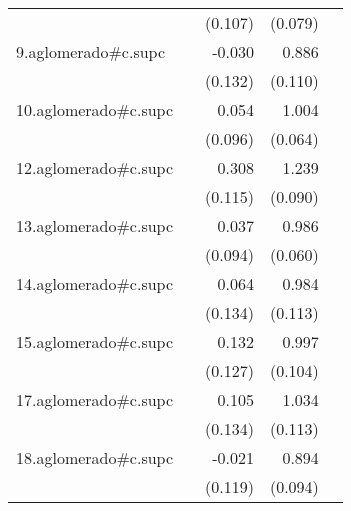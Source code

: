 {\begin{longtable}{l*{4}{D{.}{.}{-1}}}
            &                     &     (0.107)         &     (0.079)         &                     \\
\addlinespace
9.aglomerado#c.supc&                     &      -0.030         &       0.886\sym{***}&                     \\
            &                     &     (0.132)         &     (0.110)         &                     \\
\addlinespace
10.aglomerado#c.supc&                     &       0.054         &       1.004\sym{***}&                     \\
            &                     &     (0.096)         &     (0.064)         &                     \\
\addlinespace
12.aglomerado#c.supc&                     &       0.308\sym{**} &       1.239\sym{***}&                     \\
            &                     &     (0.115)         &     (0.090)         &                     \\
\addlinespace
13.aglomerado#c.supc&                     &       0.037         &       0.986\sym{***}&                     \\
            &                     &     (0.094)         &     (0.060)         &                     \\
\addlinespace
14.aglomerado#c.supc&                     &       0.064         &       0.984\sym{***}&                     \\
            &                     &     (0.134)         &     (0.113)         &                     \\
\addlinespace
15.aglomerado#c.supc&                     &       0.132         &       0.997\sym{***}&                     \\
            &                     &     (0.127)         &     (0.104)         &                     \\
\addlinespace
17.aglomerado#c.supc&                     &       0.105         &       1.034\sym{***}&                     \\
            &                     &     (0.134)         &     (0.113)         &                     \\
\addlinespace
18.aglomerado#c.supc&                     &      -0.021         &       0.894\sym{***}&                     \\
            &                     &     (0.119)         &     (0.094)         &                     \\

\end{longtable}}
